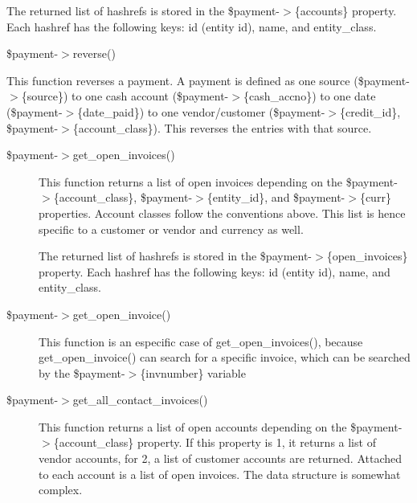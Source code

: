 \begin{description}
\begin{description}
\begin{description}
\begin{description}
\begin{description}
\begin{description}
\begin{description}
\begin{description}
\begin{description}
\begin{description}
The returned list of hashrefs is stored in the \$payment-$>$\{accounts\} property.
Each hashref has the following keys:  id (entity id), name, and entity\_class.

\end{description}
\$payment-$>$reverse()



This function reverses a payment.  A payment is defined as one source 
(\$payment-$>$\{source\}) to one cash account (\$payment-$>$\{cash\_accno\}) to one date 
(\$payment-$>$\{date\_paid\}) to one vendor/customer (\$payment-$>$\{credit\_id\}, 
\$payment-$>$\{account\_class\}).  This reverses the entries with that source.

\begin{description}

\item[{\$payment-$>$get\_open\_invoices()}] \mbox{}

This function returns a list of open invoices depending on the 
\$payment-$>$\{account\_class\}, \$payment-$>$\{entity\_id\}, and \$payment-$>$\{curr\} 
properties.  Account classes follow the conventions above.  This list is hence
specific to a customer or vendor and currency as well.



The returned list of hashrefs is stored in the \$payment-$>$\{open\_invoices\} 
property. Each hashref has the following keys:  id (entity id), name, and 
entity\_class.

\end{description}
\begin{description}

\item[{\$payment-$>$get\_open\_invoice()}] \mbox{}

This function is an especific case of get\_open\_invoices(), because get\_open\_invoice() 
can search for a specific invoice, which can be searched by the \$payment-$>$\{invnumber\} 
variable

\end{description}
\begin{description}

\item[{\$payment-$>$get\_all\_contact\_invoices()}] \mbox{}

This function returns a list of open accounts depending on the 
\$payment-$>$\{account\_class\} property.  If this property is 1, it returns a list 
of vendor accounts, for 2, a list of customer accounts are returned.  Attached
to each account is a list of open invoices.  The data structure is somewhat 
complex.




\end{description}
\end{description}
\end{description}
\end{description}
\end{description}
\end{description}
\end{description}
\end{description}
\end{description}
\end{description}
